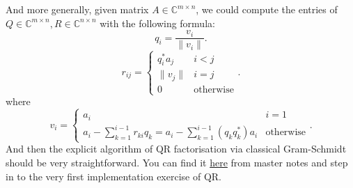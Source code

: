 \noindent And more generally, given matrix \(A \in \mathbb{C}^{m \times n}\), we could compute the entries of \(Q \in \mathbb{C}^{m \times  n}, R \in \mathbb{C}^{n \times  n}\) with the following formula:
\[
  q_i = \frac{v_{i}}{\|v_{i}\|}
.\]
\[
  r_{ij} = \left\{
    \begin{array}{ll}
    q_{i}^{*}a_{j} & i < j\\
    \|v_{j}\| & i = j\\
    0 & \text{otherwise}
    \end{array}
  \right.
.\]
where
\[
  v_{i} = \left\{
      \begin{array}{ll}
      a_{i} & i = 1\\
      a_{i} - \sum_{k=1}^{i - 1} r_{ki}q_{k} = a_{i} - \sum_{k=1}^{i - 1} (q_{k}q_{k}^{*})a_{i} & \text{otherwise}
      \end{array}
  \right.
.\]
And then the explicit algorithm of QR factorisation via classical Gram-Schmidt should be very straightforward. You can find it \href{https://comp-lin-alg.github.io/L2_QR_factorisation.html#qr-factorisation-by-classical-gram-schmidt-algorithm}{here} from master notes and step in to the very first implementation exercise of QR.
